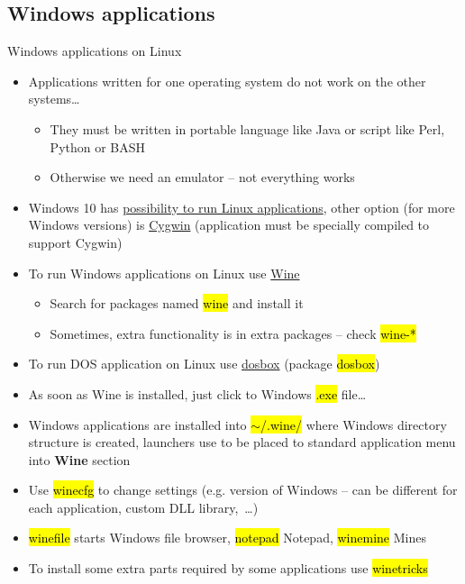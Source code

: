 \documentclass[compress, ucs, xelatex, 11pt, xcolor=svgnames,
  hyperref={
    bookmarks=true,
    unicode=true,
    colorlinks=true,
    pdftitle={Linux, command line and MetaCentrum},
    plainpages=false,
    pdfauthor={Vojtech Zeisek},
    pdfsubject={Course about use of Linux command line, writing shell scripts and using MetaCentrum of CESNET},
    pdfcreator={XeLaTeX},
    pdfkeywords={Linux, GNU, BASH, shell, command line, MetaCentrum},
    linkcolor=DarkRed,
    anchorcolor=DarkBlue,
    citecolor=Indigo,
    filecolor=NavyBlue,
    menucolor=DarkMagenta,
    urlcolor=DarkBlue,
    pdftex},
  url={hyphens, lowtilde} %
  ]{beamer}
\renewcommand{\texttt}[1]{\hl{\ttfamily #1}}
\begin{document}
\subsection{Windows applications}

\begin{frame}[allowframebreaks]{Windows applications on Linux}
  \begin{itemize}
    \item Applications written for one operating system do not work on the other systems\ldots
    \begin{itemize}
      \item They must be written in portable language like Java or script like Perl, Python or BASH
      \item Otherwise we need an emulator -- not everything works
    \end{itemize}
    \item Windows 10 has \href{https://blogs.windows.com/buildingapps/2016/07/22/fun-with-the-windows-subsystem-for-linux/}{possibility to run Linux applications}, other option (for more Windows versions) is \href{https://www.cygwin.com/}{Cygwin} (application must be specially compiled to support Cygwin)
    \item To run Windows applications on Linux use \href{https://www.winehq.org/}{Wine}
    \begin{itemize}
      \item Search for packages named \texttt{wine} and install it
      \item Sometimes, extra functionality is in extra packages -- check \texttt{wine-*}
    \end{itemize}
    \item To run DOS application on Linux use \href{http://www.dosbox.com/}{dosbox} (package \texttt{dosbox})
    \item As soon as Wine is installed, just click to Windows \texttt{*.exe} file\ldots
    \item Windows applications are installed into \texttt{$\sim$/.wine/} where Windows directory structure is created, launchers use to be placed to standard application menu into \textbf{Wine} section
    \item Use \texttt{winecfg} to change settings (e.g. version of Windows -- can be different for each application, custom DLL library,~\ldots)
    \item \texttt{winefile} starts Windows file browser, \texttt{notepad} Notepad, \texttt{winemine} Mines
    \item To install some extra parts required by some applications use \texttt{winetricks}

\end{itemize}
\end{frame}
\end{document}
